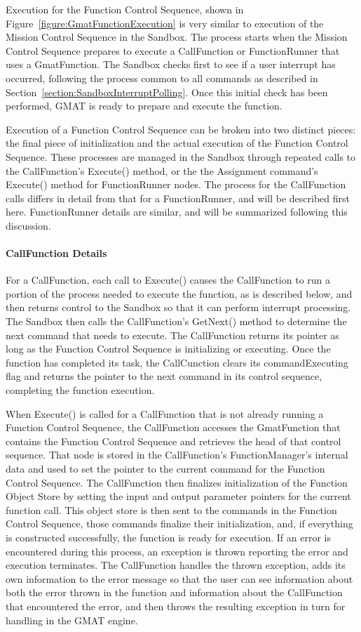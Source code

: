 Execution for the Function Control Sequence, shown in Figure~\ref{figure:GmatFunctionExecution} is
very similar to execution of the Mission Control Sequence in the Sandbox.  The process starts when
the Mission Control Sequence prepares to execute a CallFunction or FunctionRunner that uses a
GmatFunction. The Sandbox checks first to see if a user interrupt has occurred, following the
process common to all commands as described in Section~\ref{section:SandboxInterruptPolling}. Once
this initial check has been performed, GMAT is ready to prepare and execute the function.

Execution of a Function Control Sequence can be broken into two distinct pieces: the final piece of
initialization and the actual execution of the Function Control Sequence.  These processes are
managed in the Sandbox through repeated calls to the CallFunction's Execute() method, or the the
Assignment command's Execute() method for FunctionRunner nodes.  The process for the CallFunction
calls differs in detail from that for a FunctionRunner, and will be described first here. 
FunctionRunner details are similar, and will be summarized following this discussion.

\paragraph{CallFunction Details} For a CallFunction, each call to Execute() causes the CallFunction
to run a portion of the process needed to execute the function, as is described below, and then
returns control to the Sandbox so that it can perform interrupt processing.  The Sandbox then calls
the CallFunction's GetNext() method to determine the next command that needs to execute.  The
CallFunction returns its pointer as long as the Function Control Sequence is initializing or
executing.  Once the function has completed its task, the CallCunction clears its commandExecuting
flag and returns the pointer to the next command in its control sequence, completing the function
execution.

When Execute() is called for a CallFunction that is not already running a Function Control Sequence,
the CallFunction accesses the GmatFunction that contains the Function Control Sequence and
retrieves the head of that control sequence.  That node is stored in the CallFunction's
FunctionManager's internal data and used to set the pointer to the current command for the Function
Control Sequence.  The CallFunction then finalizes initialization of the Function Object Store by
setting the input and output parameter pointers for the current function call.  This object store is
then sent to the commands in the Function Control Sequence, those commands finalize their
initialization, and, if everything is constructed successfully, the function is ready for execution.
 If an error is encountered during this process, an exception is thrown reporting the error and
execution terminates.  The CallFunction handles the thrown exception, adds its own information to
the error message so that the user can see information about both the error thrown in the function
and information about the CallFunction that encountered the error, and then throws the resulting
exception in turn for handling in the GMAT engine.

